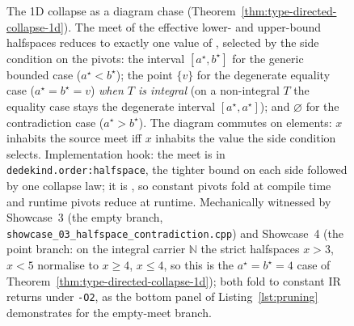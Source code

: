 \documentclass[11pt, a4paper]{article}
\begin{document}
\begin{figure}[htbp]
\centering
{}
\caption{The 1D collapse as a diagram chase (Theorem~\ref{thm:type-directed-collapse-1d}).
The meet of the effective lower- and upper-bound halfspaces reduces to exactly one value of , selected by the side condition on the pivots: the interval $[a^\star, b^\star]$ for the generic bounded case ($a^\star < b^\star$); the point $\{v\}$ for the degenerate equality case ($a^\star = b^\star = v$) \emph{when $T$ is integral} (on a non-integral $T$ the equality case stays the degenerate interval $[a^\star, a^\star]$); and $\varnothing$ for the contradiction case ($a^\star > b^\star$).
The diagram commutes on elements: $x$ inhabits the source meet iff $x$ inhabits the value the side condition selects.
Implementation hook: the meet is  in \texttt{dedekind.order:halfspace}, the tighter bound on each side followed by one collapse law; it is , so constant pivots fold at compile time and runtime pivots reduce at runtime.
Mechanically witnessed by Showcase~3 (the empty branch, \texttt{showcase\_03\_halfspace\_contradiction.cpp}) and Showcase~4 (the point branch: on the integral carrier $\mathbb{N}$ the strict halfspaces $x>3$, $x<5$ normalise to $x\ge 4$, $x\le 4$, so this is the $a^\star=b^\star=4$ case of Theorem~\ref{thm:type-directed-collapse-1d}); both fold to constant IR returns under \texttt{-O2}, as the bottom panel of Listing~\ref{lst:pruning} demonstrates for the empty-meet branch.}
\label{fig:type-directed-collapse-1d}
\end{figure}
\end{document}
